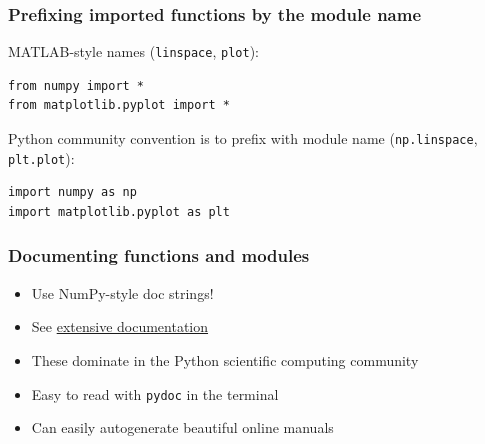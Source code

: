 \documentclass{beamer}
\begin{document}
\begin{frame}
\frametitle{Prefixing imported functions by the module name}

MATLAB-style names (\texttt{linspace}, \texttt{plot}):

\begin{verbatim}
from numpy import *
from matplotlib.pyplot import *
\end{verbatim}

Python community convention is to prefix with module name
(\texttt{np.linspace}, \texttt{plt.plot}):

\begin{verbatim}
import numpy as np
import matplotlib.pyplot as plt
\end{verbatim}
\end{frame}

\begin{frame}
\frametitle{Documenting functions and modules}

\label{softeng1:basic:docstring}

\begin{itemize}
 \item Use NumPy-style doc strings!

 \item See \href{{https://github.com/numpy/numpy/blob/master/doc/HOWTO_DOCUMENT.rst.txt}}{extensive documentation}

 \item These dominate in the Python scientific computing community

 \item Easy to read with \texttt{pydoc} in the terminal

 \item Can easily autogenerate beautiful online manuals
\end{itemize}

\noindent
\end{frame}
\end{document}
